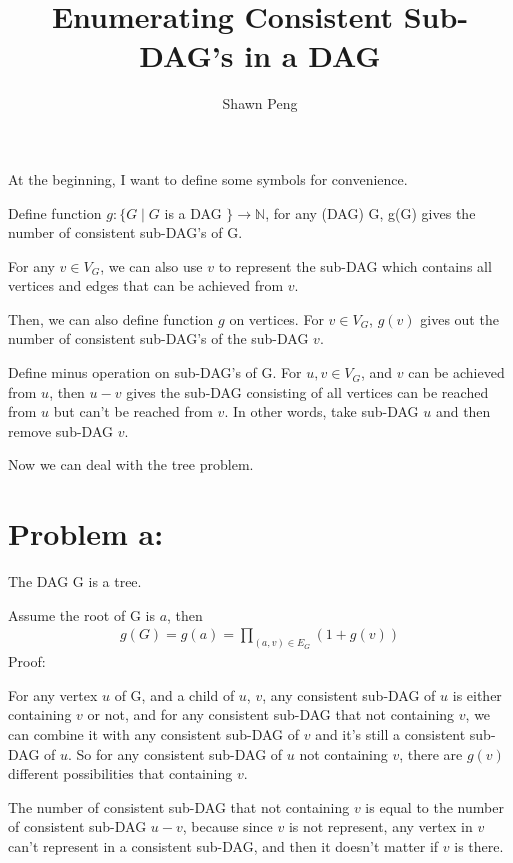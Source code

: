 \documentclass[11pt]{article}
\title{Enumerating Consistent Sub-DAG's in a DAG}
\author{Shawn Peng}
\begin{document}
	
	\maketitle
	
	\flushleft
	
	At the beginning, I want to define some symbols for convenience.
	
	\bigskip
	Define function $g:\{G \mid G$ is a DAG $\}\to\mathbb{N}$, for any (DAG) G, g(G) gives the number of consistent sub-DAG's of G.
	
	\bigskip
	For any $v \in V_G$, we can also use $v$ to represent the sub-DAG which contains all vertices and edges that can be achieved from $v$.
	
	\bigskip
	Then, we can also define function $g$ on vertices. For $v \in V_G$, $g(v)$ gives out the number of consistent sub-DAG's of the sub-DAG $v$.
	
	\bigskip
	Define minus operation on sub-DAG's of G. For $u,v \in V_G$, and $v$ can be achieved from $u$, then $u-v$ gives the sub-DAG consisting of all vertices can be reached from $u$ but can't be reached from $v$. In other words, take sub-DAG $u$ and then remove sub-DAG $v$.
	
	Now we can deal with the tree problem.
	
	\bigskip
	\section*{Problem a:}
	
	The DAG G is a tree.
	
	Assume the root of G is $a$, then
	\flushleft
	\begin{align}\label{eqn1}
		g(G)=g(a)=\prod_{(a,v)\in E_G}(1+g(v))
	\end{align}
	Proof:
	
	For any vertex $u$ of G, and a child of $u$, $v$, any consistent sub-DAG of $u$ is either containing $v$ or not, and for any consistent sub-DAG that not containing $v$, we can combine it with any consistent sub-DAG of $v$ and it's still a consistent sub-DAG of $u$. So for any consistent sub-DAG of $u$ not containing $v$, there are $g(v)$ different possibilities that containing $v$.
	
	\bigskip
	The number of consistent sub-DAG that not containing $v$ is equal to the number of consistent sub-DAG $u-v$, because since $v$ is not represent, any vertex in $v$ can't represent in a consistent sub-DAG, and then it doesn't matter if $v$ is there.
	
\end{document}
